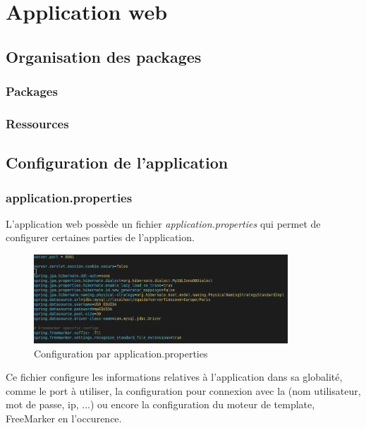 \chapter{Application web}

	\section{Organisation des packages}

		\subsection{Packages}


		\subsection{Ressources}


	\section{Configuration de l'application}

		\subsection{application.properties}

			L'application web possède un fichier \textit{application.properties} qui permet de configurer certaines parties de l'application.

			\begin{figure}[H]
				\centering\includegraphics[width=0.85\textwidth, keepaspectratio]{res/application-properties.png}
				\caption{Configuration par application.properties}
			\end{figure}

			Ce fichier configure les informations relatives à l'application dans sa globalité, comme le port à utiliser, la configuration pour connexion avec la \bdd{} (nom utilisateur, mot de passe, ip, ...) ou encore la configuration du moteur de template, FreeMarker en l'occurence.

